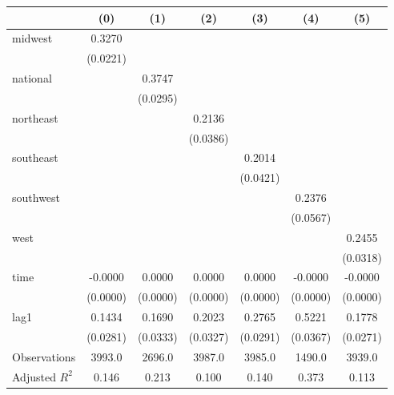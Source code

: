 \begin{tabular}{lcccccc}
\toprule
 & (0) & (1) & (2) & (3) & (4) & (5) \\
\midrule
midwest & 0.3270 &  &  &  &  &  \\
\vspace{0.2cm}
 & (0.0221) &  &  &  &  &  \\
national &  & 0.3747 &  &  &  &  \\
\vspace{0.2cm}
 &  & (0.0295) &  &  &  &  \\
northeast &  &  & 0.2136 &  &  &  \\
\vspace{0.2cm}
 &  &  & (0.0386) &  &  &  \\
southeast &  &  &  & 0.2014 &  &  \\
\vspace{0.2cm}
 &  &  &  & (0.0421) &  &  \\
southwest &  &  &  &  & 0.2376 &  \\
\vspace{0.2cm}
 &  &  &  &  & (0.0567) &  \\
west &  &  &  &  &  & 0.2455 \\
\vspace{0.2cm}
 &  &  &  &  &  & (0.0318) \\
time & -0.0000 & 0.0000 & 0.0000 & 0.0000 & -0.0000 & -0.0000 \\
\vspace{0.2cm}
 & (0.0000) & (0.0000) & (0.0000) & (0.0000) & (0.0000) & (0.0000) \\
lag1 & 0.1434 & 0.1690 & 0.2023 & 0.2765 & 0.5221 & 0.1778 \\
\vspace{0.2cm}
 & (0.0281) & (0.0333) & (0.0327) & (0.0291) & (0.0367) & (0.0271) \\
\midrule
Observations & 3993.0 & 2696.0 & 3987.0 & 3985.0 & 1490.0 & 3939.0 \\
Adjusted $R^2$ & 0.146 & 0.213 & 0.100 & 0.140 & 0.373 & 0.113 \\
\bottomrule
\end{tabular}